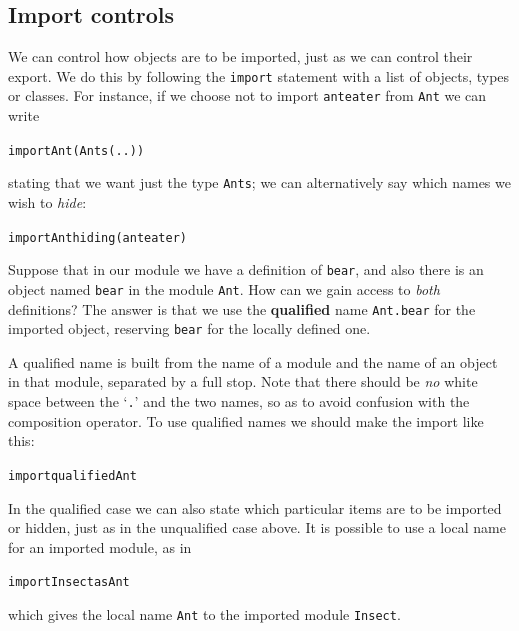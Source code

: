 

\subsection*{Import controls}

We can control how objects are to be imported, just as we can control their
export. We do this by following the \texttt{import} statement with a list of
objects, types or classes. For instance, if we choose not to import 
\texttt{anteater} from \texttt{Ant} we can write

\begin{alltt}
import Ant ( Ants(..) )
\end{alltt}
stating that we want just the type \texttt{Ants}; we can alternatively say which
names we wish to {\em hide}:
\begin{alltt} 
import Ant hiding ( anteater )
\end{alltt}
Suppose that in our module we have a definition of \texttt{bear}, and also there
is an object named \texttt{bear} in the module \texttt{Ant}. How can we gain access
to {\em both\/} definitions? The answer is that we use the \textbf{qualified}
name \texttt{Ant.bear} for the imported object, reserving \texttt{bear} for the
locally defined one. 

A qualified name is built from the
name of a module and the name of an object in that module, separated by a full
stop. Note that there should be {\em no\/}
white space between the `\texttt{.}' and the
two names, so as to avoid confusion with the composition operator. 
To use qualified names we should make the import like this:
\begin{alltt}
import qualified Ant
\end{alltt}
In the qualified case we can also state which particular items are to be
imported or hidden, just as in the unqualified case above. It is
possible to use a local name for an imported module, as in
\minx{=}
\begin{alltt}
import Insect as Ant
\end{alltt}
which gives the local name \texttt{Ant} to the imported module
\texttt{Insect}.


